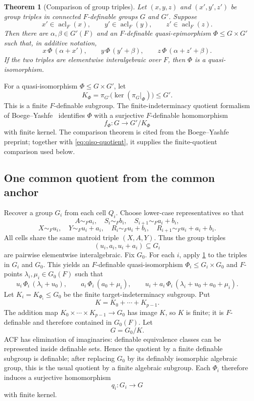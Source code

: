 \documentclass[11pt]{article}
\newtheorem{theorem}{Theorem}[section]
\theoremstyle{definition}
\newcommand{\acl}{\operatorname{acl}}
\newcommand{\simF}{\mathrel{\sim_F}}
\begin{document}
\begin{theorem}[Comparison of group triples]\label{thm:compare}
Let $(x,y,z)$ and $(x',y',z')$ be group triples in connected $F$-definable groups $G$ and $G'$.  Suppose
\[
x'\in\acl_F(x),\qquad y'\in\acl_F(y),\qquad z'\in\acl_F(z).
\]
Then there are $\alpha,\beta\in G'(F)$ and an $F$-definable quasi-epimorphism $\Phi\le G\times G'$ such that, in additive notation,
\begin{equation}\label{eq:explicit-compare}
 x\,\Phi\,(\alpha+x'),\qquad
 y\,\Phi\,(y'+\beta),\qquad
 z\,\Phi\,(\alpha+z'+\beta).
\end{equation}
If the two triples are elementwise interalgebraic over $F$, then $\Phi$ is a quasi-isomorphism.
\end{theorem}

For a quasi-isomorphism $\Phi\le G\times G'$, let
\[
K_\Phi=\pi_{G'}\bigl(\ker(\pi_G|_\Phi)\bigr)\le G'.
\]
This is a finite $F$-definable subgroup.  The finite-indeterminacy quotient formalism of Boege--Yashfe~\cite[Remark~3.3]{BoegeYashfe2026} identifies $\Phi$ with a surjective $F$-definable homomorphism
\begin{equation}\label{eq:qiso-quotient}
 f_\Phi:G\longrightarrow G'/K_\Phi
\end{equation}
with finite kernel.  The comparison theorem is cited from the Boege--Yashfe preprint; together with \eqref{eq:qiso-quotient}, it supplies the finite-quotient comparison used below.


\subsection{One common quotient from the common anchor}

Recover a group $G_i$ from each cell $Q_i$.  Choose lower-case representatives so that
\begin{equation}\label{eq:cellcoords}
A\simF a_i,\quad S_i\simF b_i,\quad S_{i+1}\simF a_i+b_i,
\end{equation}
\[
X\simF u_i,\quad Y\simF u_i+a_i,\quad
R_i\simF u_i+b_i,\quad R_{i+1}\simF u_i+a_i+b_i.
\]
All cells share the same matroid triple $(X,A,Y)$.  Thus the group triples
\[
(u_i,a_i,u_i+a_i)\subseteq G_i
\]
are pairwise elementwise interalgebraic.  Fix $G_0$.  For each $i$, apply \cref{thm:compare} to the triples in $G_i$ and $G_0$.  This yields an $F$-definable quasi-isomorphism $\Phi_i\le G_i\times G_0$ and $F$-points $\lambda_i,\mu_i\in G_0(F)$ such that
\[
u_i\,\Phi_i\,(\lambda_i+u_0),\qquad
 a_i\,\Phi_i\,(a_0+\mu_i),\qquad
 u_i+a_i\,\Phi_i\,(\lambda_i+u_0+a_0+\mu_i).
\]
Let $K_i=K_{\Phi_i}\le G_0$ be the finite target-indeterminacy subgroup.  Put
\[
K=K_0+\cdots+K_{p-1}.
\]
The addition map $K_0\times\cdots\times K_{p-1}\to G_0$ has image $K$, so $K$ is finite; it is $F$-definable and therefore contained in $G_0(F)$.  Let
\[
G=G_0/K.
\]
ACF has elimination of imaginaries: definable equivalence classes can be represented inside definable sets.  Hence the quotient by a finite definable subgroup is definable; after replacing $G_0$ by its definably isomorphic algebraic group, this is the usual quotient by a finite algebraic subgroup.  Each $\Phi_i$ therefore induces a surjective homomorphism
\[
q_i:G_i\longrightarrow G
\]
with finite kernel.
\end{document}
